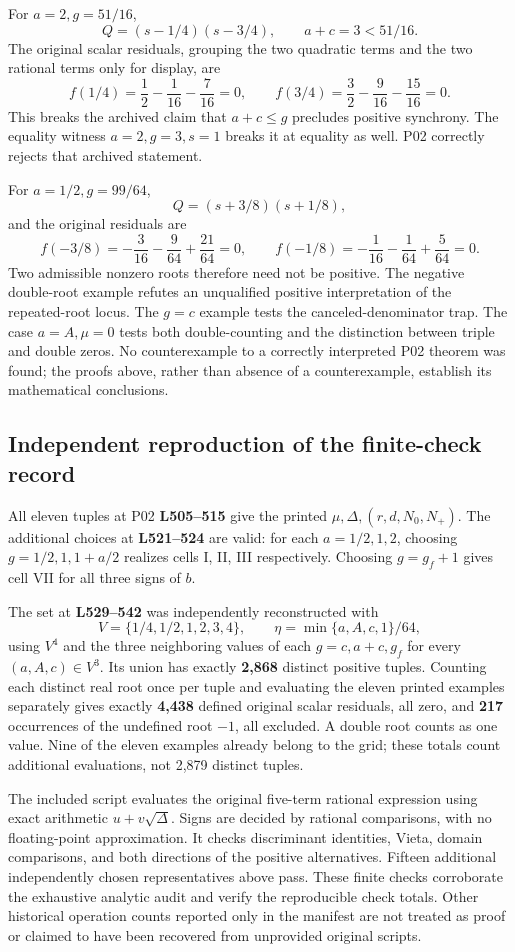 \documentclass[11pt]{article}
\newcommand{\lin}[1]{\textbf{L#1}}
\begin{document}
For \(a=2,g=51/16\),
\[
Q=(s-1/4)(s-3/4),\qquad a+c=3<51/16.
\]
The original scalar residuals, grouping the two quadratic terms and
the two rational terms only for display, are
\[
f(1/4)=\frac12-\frac1{16}-\frac7{16}=0,\qquad
f(3/4)=\frac32-\frac9{16}-\frac{15}{16}=0.
\]
This breaks the archived claim that \(a+c\le g\) precludes positive
synchrony. The equality witness \(a=2,g=3,s=1\) breaks it at
equality as well. P02 correctly rejects that archived statement.

For \(a=1/2,g=99/64\),
\[
Q=(s+3/8)(s+1/8),
\]
and the original residuals are
\[
f(-3/8)=-\frac3{16}-\frac9{64}+\frac{21}{64}=0,\qquad
f(-1/8)=-\frac1{16}-\frac1{64}+\frac5{64}=0.
\]
Two admissible nonzero roots therefore need not be positive.
The negative double-root example refutes an unqualified positive
interpretation of the repeated-root locus. The \(g=c\) example tests
the canceled-denominator trap. The case \(a=A,\mu=0\) tests both
double-counting and the distinction between triple and double zeros.
No counterexample to a correctly interpreted P02 theorem was found;
the proofs above, rather than absence of a counterexample, establish
its mathematical conclusions.

\subsection{Independent reproduction of the finite-check record}

All eleven tuples at P02 \lin{505--515} give the printed
\(\mu,\Delta,(r,d,N_0,N_+)\). The additional choices at
\lin{521--524} are valid: for each \(a=1/2,1,2\), choosing
\(g=1/2,1,1+a/2\) realizes cells I, II, III respectively.
Choosing \(g=g_f+1\) gives cell VII for all three signs of \(b\).

The set at \lin{529--542} was independently reconstructed with
\[
V=\{1/4,1/2,1,2,3,4\},\qquad
\eta=\min\{a,A,c,1\}/64,
\]
using \(V^4\) and the three neighboring values of each
\(g=c,a+c,g_f\) for every \((a,A,c)\in V^3\).
Its union has exactly \textbf{2,868} distinct positive tuples.
Counting each distinct real root once per tuple and evaluating the
eleven printed examples separately gives exactly \textbf{4,438}
defined original scalar residuals, all zero, and \textbf{217}
occurrences of the undefined root \(-1\), all excluded.
A double root counts as one value. Nine of the eleven examples
already belong to the grid; these totals count additional evaluations,
not 2,879 distinct tuples.

The included script evaluates the original five-term rational
expression using exact arithmetic \(u+v\sqrt{\Delta}\).
Signs are decided by rational comparisons, with no floating-point
approximation. It checks discriminant identities, Vieta, domain
comparisons, and both directions of the positive alternatives.
Fifteen additional independently chosen representatives above pass.
These finite checks corroborate the exhaustive analytic audit and
verify the reproducible check totals. Other historical operation counts
reported only in the manifest are not treated as proof or claimed to
have been recovered from unprovided original scripts.
\end{document}
